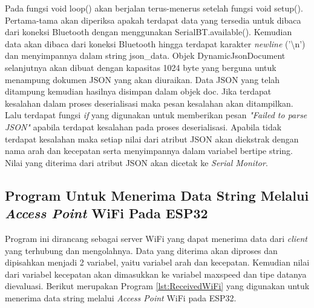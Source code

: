 Pada fungsi void loop() akan berjalan terus-menerus setelah fungsi void setup(). Pertama-tama akan diperiksa apakah terdapat data yang tersedia untuk dibaca dari koneksi Bluetooth dengan menggunakan SerialBT.available(). Kemudian data akan dibaca dari koneksi Bluetooth hingga terdapat karakter \emph{newline} ('\textbackslash n') dan menyimpannya dalam string json\_data. Objek DynamicJsonDocument selanjutnya akan dibuat dengan kapasitas 1024 byte yang berguna untuk menampung dokumen JSON yang akan diuraikan. Data JSON yang telah ditampung kemudian hasilnya disimpan dalam objek doc. Jika terdapat kesalahan dalam proses deserialisasi maka pesan kesalahan akan ditampilkan. Lalu terdapat fungsi \emph{if} yang digunakan untuk memberikan pesan \emph{"Failed to parse JSON"} apabila terdapat kesalahan pada proses deserialisasi. Apabila tidak terdapat kesalahan maka setiap nilai dari atribut JSON akan diekstrak dengan nama arah dan kecepatan serta menyimpannya dalam variabel bertipe string. Nilai yang diterima dari atribut JSON akan dicetak ke \emph{Serial Monitor}.


\subsection{Program Untuk Menerima Data String Melalui \emph{Access Point} WiFi Pada ESP32}

Program ini dirancang sebagai server WiFi yang dapat menerima data dari \emph{client} yang terhubung dan mengolahnya. Data yang diterima akan diproses dan dipisahkan menjadi 2 variabel, yaitu variabel arah dan kecepatan. Kemudian nilai dari variabel kecepatan akan dimasukkan ke variabel maxspeed dan tipe datanya dievaluasi. Berikut merupakan Program \ref{lst:ReceivedWiFi} yang digunakan untuk menerima data string melalui \emph{Access Point} WiFi pada ESP32.

